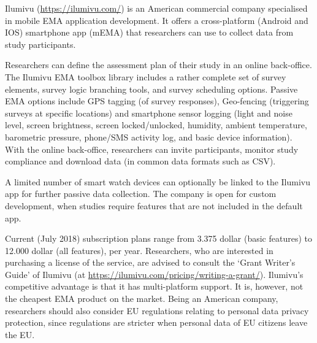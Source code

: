 \documentclass[]{book}
\begin{document}

Ilumivu (\url{https://ilumivu.com/}) is an American commercial company
specialised in mobile EMA application development. It offers a
cross-platform (Android and IOS) smartphone app (mEMA) that researchers
can use to collect data from study participants.

Researchers can define the assessment plan of their study in an online
back-office. The Ilumivu EMA toolbox library includes a rather complete
set of survey elements, survey logic branching tools, and survey
scheduling options. Passive EMA options include GPS tagging (of survey
responses), Geo-fencing (triggering surveys at specific locations) and
smartphone sensor logging (light and noise level, screen brightness,
screen locked/unlocked, humidity, ambient temperature, barometric
pressure, phone/SMS activity log, and basic device information). With
the online back-office, researchers can invite participants, monitor
study compliance and download data (in common data formats such as CSV).

A limited number of smart watch devices can optionally be linked to the
Ilumivu app for further passive data collection. The company is open for
custom development, when studies require features that are not included
in the default app.

Current (July 2018) subscription plans range from 3.375 dollar (basic
features) to 12.000 dollar (all features), per year. Researchers, who
are interested in purchasing a license of the service, are advised to
consult the `Grant Writer's Guide' of Ilumivu (at
\url{https://ilumivu.com/pricing/writing-a-grant/}). Ilumivu's
competitive advantage is that it has multi-platform support. It is,
however, not the cheapest EMA product on the market. Being an American
company, researchers should also consider EU regulations relating to
personal data privacy protection, since regulations are stricter when
personal data of EU citizens leave the EU.
\end{document}
